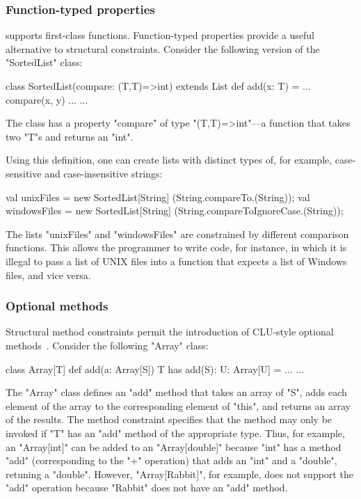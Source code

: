\subsubsection{Function-typed properties}

\Xten{} supports first-class functions.
Function-typed properties provide a useful alternative to
structural constraints.
Consider the following version of the
\xcd"SortedList" class:
{\footnotesize
\begin{xten}
class SortedList(compare: (T,T)=>int) extends List {
    def add(x: T) = { ... compare(x, y) ... }
    ...
}
\end{xten}}
\noindent
The class has a property \xcd"compare" of type
\xcd"(T,T)=>int"---a function that takes two \xcd"T"s and
returns an \xcd"int".  

Using this definition, one can create lists with distinct types
of, for example, case-sensitive and case-insensitive strings:
{\footnotesize\begin{xten}
val unixFiles
  = new SortedList[String]
        (String.compareTo.(String));
val windowsFiles
  = new SortedList[String]
        (String.compareToIgnoreCase.(String));
\end{xten}}

\noindent
The lists \xcd"unixFiles" and \xcd"windowsFiles" are constrained
by different comparison functions.  This allows the programmer
to write code, for instance, in which it is illegal to pass a list of UNIX
files into a function that expects a list of Windows files, and
vice versa.

\subsubsection{Optional methods}

Structural method constraints permit the introduction of
CLU-style optional methods~\cite{clu}.  Consider the following
\xcd"Array" class:
{\footnotesize
\begin{xten}
class Array[T] {
  def add(a: Array[S])
    {T has add(S): U}: Array[U] = { ... }
  ...
}
\end{xten}}

\noindent
The \xcd"Array" class defines an \xcd"add" method that takes 
an array of \xcd"S", adds each element of the array to the
corresponding element of \xcd"this", and returns an array of the
results.  The method constraint specifies that the method may
only be invoked if \xcd"T" has an \xcd"add" method of the
appropriate type.  Thus, for example, an \xcd"Array[int]"
can be added to an \xcd"Array[double]" because \xcd"int"
has a method \xcd"add" (corresponding to the \xcd"+" operation)
that adds an \xcd"int" and a \xcd"double", retuning a
\xcd"double".  However, \xcd"Array[Rabbit]", for example, does not support
the \xcd"add" operation because \xcd"Rabbit" does not have an
\xcd"add" method.





